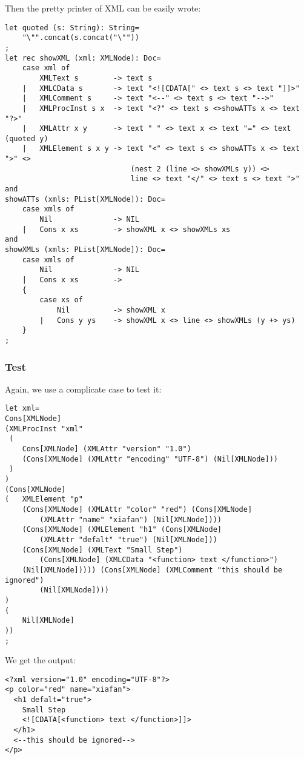 Then the pretty printer of XML can be easily wrote:

\begin{lstlisting}
let quoted (s: String): String=
    "\"".concat(s.concat("\""))
;
let rec showXML (xml: XMLNode): Doc=
    case xml of
        XMLText s        -> text s
    |   XMLCData s       -> text "<![CDATA[" <> text s <> text "]]>"
    |   XMLComment s     -> text "<--" <> text s <> text "-->"
    |   XMLProcInst s x  -> text "<?" <> text s <>showATTs x <> text "?>"
    |   XMLAttr x y      -> text " " <> text x <> text "=" <> text (quoted y)
    |   XMLElement s x y -> text "<" <> text s <> showATTs x <> text ">" <>
                             (nest 2 (line <> showXMLs y)) <>
                             line <> text "</" <> text s <> text ">"
and
showATTs (xmls: PList[XMLNode]): Doc=
    case xmls of
        Nil              -> NIL
    |   Cons x xs        -> showXML x <> showXMLs xs
and
showXMLs (xmls: PList[XMLNode]): Doc=
    case xmls of
        Nil              -> NIL
    |   Cons x xs        ->
    {
        case xs of
            Nil          -> showXML x
        |   Cons y ys    -> showXML x <> line <> showXMLs (y +> ys)
    }
;
\end{lstlisting}

\subsubsection{Test}

Again, we use a complicate case to test it:

\begin{lstlisting}
let xml=
Cons[XMLNode]
(XMLProcInst "xml"
 (
    Cons[XMLNode] (XMLAttr "version" "1.0")
    (Cons[XMLNode] (XMLAttr "encoding" "UTF-8") (Nil[XMLNode]))
 )
)
(Cons[XMLNode]
(   XMLElement "p"
    (Cons[XMLNode] (XMLAttr "color" "red") (Cons[XMLNode]
        (XMLAttr "name" "xiafan") (Nil[XMLNode])))
    (Cons[XMLNode] (XMLElement "h1" (Cons[XMLNode]
        (XMLAttr "defalt" "true") (Nil[XMLNode]))
    (Cons[XMLNode] (XMLText "Small Step")
        (Cons[XMLNode] (XMLCData "<function> text </function>")
    (Nil[XMLNode])))) (Cons[XMLNode] (XMLComment "this should be ignored")
        (Nil[XMLNode])))
)
(
    Nil[XMLNode]
))
;
\end{lstlisting}

We get the output:
\begin{lstlisting}
<?xml version="1.0" encoding="UTF-8"?>
<p color="red" name="xiafan">
  <h1 defalt="true">
    Small Step
    <![CDATA[<function> text </function>]]>
  </h1>
  <--this should be ignored-->
</p>
\end{lstlisting}



